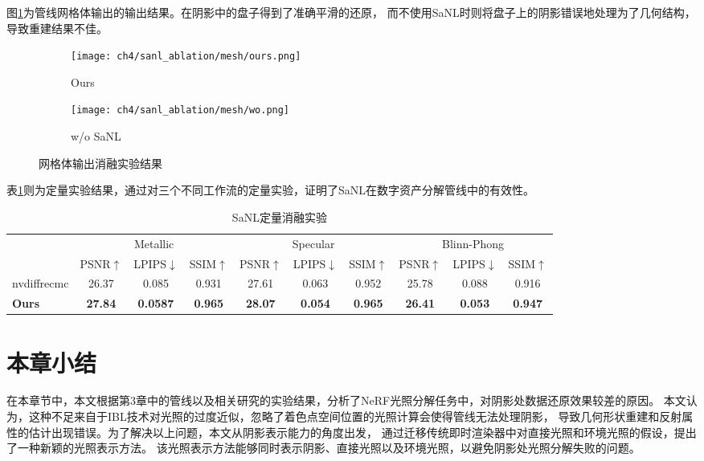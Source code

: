 图\ref{fig:mesh_ablation}为管线网格体输出的输出结果。在阴影中的盘子得到了准确平滑的还原，
而不使用SaNL时则将盘子上的阴影错误地处理为了几何结构，导致重建结果不佳。

\begin{figure}[H]
  \centering
  \begin{subfigure}[c]{0.47\textwidth}
    \centering
    \texttt{[image: ch4/sanl\_ablation/mesh/ours.png]}
    \caption{Ours}
  \end{subfigure}
  \begin{subfigure}[c]{0.47\textwidth}
    \centering
    \texttt{[image: ch4/sanl\_ablation/mesh/wo.png]}
    \caption{w/o SaNL}
  \end{subfigure}
  \caption{网格体输出消融实验结果}
  \label{fig:mesh_ablation}
\end{figure}

表\ref{tab:sanl_quan}则为定量实验结果，通过对三个不同工作流的定量实验，证明了SaNL在数字资产分解管线中的有效性。

\begin{table}[h]
  \centering
  \caption{SaNL定量消融实验}
  \begin{tabular}{l ccc ccc ccc}
      \toprule
      & \multicolumn{3}{c}{Metallic} & \multicolumn{3}{c}{Specular} & \multicolumn{3}{c}{Blinn-Phong} \\
      \cmidrule(lr){2-4} \cmidrule(lr){5-7} \cmidrule(lr){8-10}
      & PSNR$\uparrow$ & LPIPS$\downarrow$ & SSIM$\uparrow$ & PSNR$\uparrow$ & LPIPS$\downarrow$ & SSIM$\uparrow$ & PSNR$\uparrow$ & LPIPS$\downarrow$ & SSIM$\uparrow$ \\
      \midrule
      nvdiffrecmc & 26.37 & 0.085 & 0.931 & 27.61 & 0.063 & 0.952 & 25.78 & 0.088 & 0.916 \\
      \textbf{Ours} & \textbf{27.84} & \textbf{0.0587} & \textbf{0.965} & \textbf{28.07} & \textbf{0.054} & \textbf{0.965} & \textbf{26.41} & \textbf{0.053} & \textbf{0.947} \\
      \bottomrule
  \end{tabular}
  \label{tab:sanl_quan}
\end{table}

\section{本章小结}

在本章节中，本文根据第3章中的管线以及相关研究的实验结果，分析了NeRF光照分解任务中，对阴影处数据还原效果较差的原因。
本文认为，这种不足来自于IBL技术对光照的过度近似，忽略了着色点空间位置的光照计算会使得管线无法处理阴影，
导致几何形状重建和反射属性的估计出现错误。为了解决以上问题，本文从阴影表示能力的角度出发，
通过迁移传统即时渲染器中对直接光照和环境光照的假设，提出了一种新颖的光照表示方法。
该光照表示方法能够同时表示阴影、直接光照以及环境光照，以避免阴影处光照分解失败的问题。

